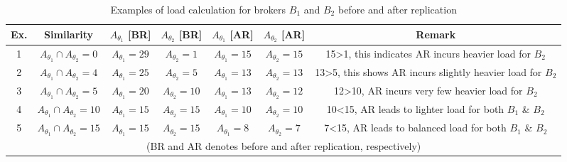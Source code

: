 \begin{table}\fontsize{8.6}{10}\selectfont
\centering
\caption{Examples of load calculation for brokers $B_1$ and $B_2$ before and after replication}
\renewcommand{\arraystretch}{2.3}
\begin{tabular}{|c|c|c|c|c|c|c|}
\hline
\multicolumn{1}{c}{{Ex.}} & \multicolumn{1}{c}{{Similarity}} & \multicolumn{1}{c}{{$A_{\theta_1}$ [BR]}} & \multicolumn{1}{c}{{$A_{\theta_2}$ [BR]}} & \multicolumn{1}{c}{{$A_{\theta_1}$ [AR]}} & \multicolumn{1}{c}{{$A_{\theta_2}$ [AR]}} &
\multicolumn{1}{c}{{Remark}}\\
\hline
\multicolumn{1}{c}{1} & \multicolumn{1}{c}{$A_{\theta_1} \cap A_{\theta_2}=0$} & \multicolumn{1}{c}{$A_{\theta_1}=29$} & \multicolumn{1}{c}{$A_{\theta_2}=1$} & \multicolumn{1}{c}{$A_{\theta_1}=15$} & \multicolumn{1}{c}{$A_{\theta_2}=15$} & \multicolumn{1}{c}{15>1, this indicates AR incurs heavier load for $B_2$}\\
\multicolumn{1}{c}{2} & \multicolumn{1}{c}{$A_{\theta_1} \cap A_{\theta_2}=4$} & \multicolumn{1}{c}{$A_{\theta_1}=25$} & \multicolumn{1}{c}{$A_{\theta_2}=5$} & \multicolumn{1}{c}{$A_{\theta_1}=13$} & \multicolumn{1}{c}{$A_{\theta_2}=13$} & \multicolumn{1}{c}{13>5, this shows AR incurs slightly heavier load for $B_2$}\\
\multicolumn{1}{c}{3} & \multicolumn{1}{c}{$A_{\theta_1} \cap A_{\theta_2}=5$} & \multicolumn{1}{c}{$A_{\theta_1}=20$} & \multicolumn{1}{c}{$A_{\theta_2}=10$} & \multicolumn{1}{c}{$A_{\theta_1}=13$} & \multicolumn{1}{c}{$A_{\theta_2}=12$} & \multicolumn{1}{c}{12>10, AR incurs very few heavier load for $B_2$}\\
\multicolumn{1}{c}{4} & \multicolumn{1}{c}{$A_{\theta_1} \cap A_{\theta_2}=10$} & \multicolumn{1}{c}{$A_{\theta_1}=15$} & \multicolumn{1}{c}{$A_{\theta_2}=15$} & \multicolumn{1}{c}{$A_{\theta_1}=10$} & \multicolumn{1}{c}{$A_{\theta_2}=10$} & \multicolumn{1}{c}{10<15, AR leads to lighter load for both $B_1$ \& $B_2$}\\
\multicolumn{1}{c}{5} & \multicolumn{1}{c}{$A_{\theta_1} \cap A_{\theta_2}=15$} & \multicolumn{1}{c}{$A_{\theta_1}=15$} & \multicolumn{1}{c}{$A_{\theta_2}=15$} & \multicolumn{1}{c}{$A_{\theta_1}=8$} & \multicolumn{1}{c}{$A_{\theta_2}=7$} & \multicolumn{1}{c}{7<15, AR leads to balanced load for both $B_1$ \& $B_2$}\\
\hline
\multicolumn{7}{c}{(BR and AR denotes before and after replication, respectively)}\\
\end{tabular}
\end{table}

